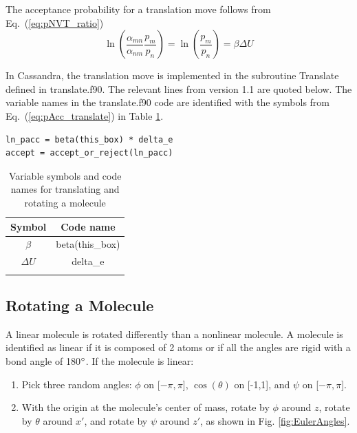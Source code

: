 The acceptance probability for a translation move follows from Eq.\ (\ref{eq:pNVT_ratio})
\begin{equation}
\label{eq:pAcc_translate}
\ln \left( \frac{\alpha_{mn}}{\alpha_{nm}} \frac{p_m}{p_n} \right) = \ln \left( \frac{p_m}{p_n} \right) = \beta \Delta U
\end{equation}

In Cassandra, the translation move is implemented in the subroutine Translate defined in translate.f90. The relevant lines from version 1.1 are quoted below. The variable names in the translate.f90 code are identified with the symbols from Eq.\ (\ref{eq:pAcc_translate}) in Table \ref{table:translate}.

\begin{lstlisting}[firstnumber=274, caption=translate.f90, label=code:translate]
ln_pacc = beta(this_box) * delta_e
accept = accept_or_reject(ln_pacc)
\end{lstlisting}

\begin{table}
\caption{Variable symbols and code names for translating and rotating a molecule}
\label{table:translate}
\centering
\begin{tabular}{|c|c|} \hline
 {\bf Symbol} & {\bf Code name} \\ \hline
 $\beta$ & beta(this\_box) \\
 $\Delta U$ & delta\_e \\
 \hline
\multicolumn{2}{c}{}
\end{tabular}
\end{table}

\subsection{Rotating a Molecule}
\label{sec:rotate}
A linear molecule is rotated differently than a nonlinear molecule. A molecule is identified as linear if it is composed of 2 atoms or if all the angles are rigid with a bond angle of 180$\degree$. If the molecule is linear: 

\begin{enumerate}
	\item Pick three random angles: $\phi$ on [$-\pi,\pi$], $\cos(\theta)$ on [-1,1], and $\psi$ on [$-\pi,\pi$].
	\item With the origin at the molecule's center of mass, rotate by $\phi$ around $z$, rotate by $\theta$ around $x'$, and rotate by $\psi$ around $z'$, as shown in Fig. \ref{fig:EulerAngles}.
\end{enumerate}

